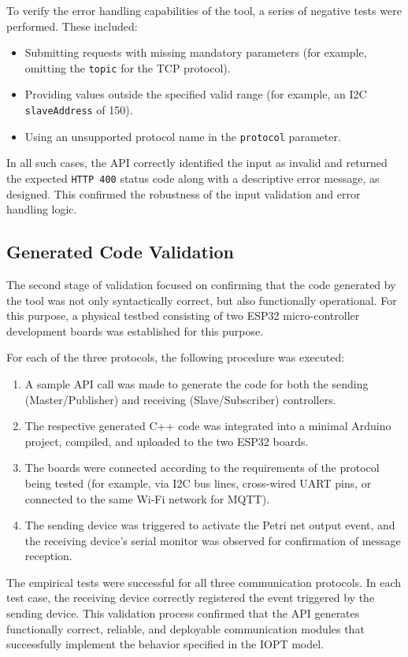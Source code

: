 To verify the error handling capabilities of the tool, a series of negative tests were performed. These included:
\begin{itemize}
    \item Submitting requests with missing mandatory parameters (for example, omitting the \texttt{topic} for the TCP protocol).
    \item Providing values outside the specified valid range (for example, an I2C \texttt{slaveAddress} of 150).
    \item Using an unsupported protocol name in the \texttt{protocol} parameter.
\end{itemize}
In all such cases, the API correctly identified the input as invalid and returned the expected \texttt{HTTP 400} status code along with a descriptive error message, as designed. This confirmed the robustness of the input validation and error handling logic.

\subsection{Generated Code Validation}
\label{subsec:code_validation}

The second stage of validation focused on confirming that the code generated by the tool was not only syntactically correct, but also functionally operational. For this purpose, a physical testbed consisting of two ESP32 micro-controller development boards was established for this purpose.

For each of the three protocols, the following procedure was executed:
\begin{enumerate}
    \item A sample API call was made to generate the code for both the sending (Master/Publisher) and receiving (Slave/Subscriber) controllers.
    \item The respective generated C++ code was integrated into a minimal Arduino project, compiled, and uploaded to the two ESP32 boards.
    \item The boards were connected according to the requirements of the protocol being tested (for example, via I2C bus lines, cross-wired UART pins, or connected to the same Wi-Fi network for MQTT).
    \item The sending device was triggered to activate the Petri net output event, and the receiving device's serial monitor was observed for confirmation of message reception.
\end{enumerate}

The empirical tests were successful for all three communication protocols. In each test case, the receiving device correctly registered the event triggered by the sending device. This validation process confirmed that the API generates functionally correct, reliable, and deployable communication modules that successfully implement the behavior specified in the IOPT model.


